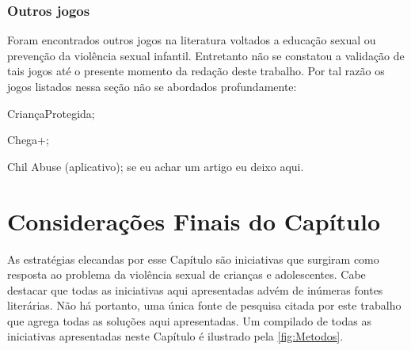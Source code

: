 


\newpage

\subsubsection{Outros jogos}\label{sssec:outros}

Foram encontrados outros jogos na literatura voltados a educação sexual ou prevenção da violência sexual infantil. Entretanto não se constatou a validação de tais jogos até o presente momento da redação deste trabalho. Por tal razão os jogos listados nessa seção não se abordados profundamente: 

CriançaProtegida;

Chega+;

Chil Abuse (aplicativo); se eu achar um artigo eu deixo aqui.


\section{Considerações Finais do Capítulo}\label{sec:finais}


As estratégias elecandas por esse Capítulo são iniciativas que surgiram como resposta ao problema da violência sexual de crianças e adolescentes. Cabe destacar que todas as iniciativas aqui apresentadas advém de inúmeras fontes literárias. Não há portanto, uma única fonte de pesquisa citada por este trabalho que agrega todas as soluções aqui apresentadas. Um compilado de todas as iniciativas apresentadas neste Capítulo é ilustrado pela \autoref{fig:Metodos}.



